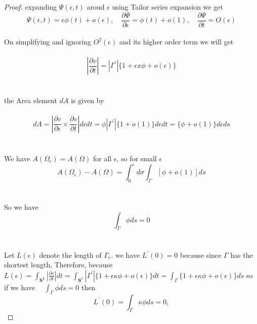 \documentclass[oneside]{book}
\begin{document}
\begin{proof}
expanding $\Psi(\epsilon, t)$ aroud $\epsilon$ using Tailor series expansion we get \\

$$
\Psi(\epsilon, t)=\epsilon \phi(t)+o(\epsilon), \quad \frac{\partial \Psi}{\partial \epsilon}=\phi(t)+o(1), \quad \frac{\partial \Psi}{\partial t}=O(\epsilon)
$$ \\
On simplifying and ignoring $O^2(\epsilon)$ and its higher order term we will get \\\\
$$
\left|\frac{\partial v}{\partial t}\right|=\left|\Gamma^{\prime}\right|\{1+\epsilon x \phi+o(\epsilon)\}
$$ 
\\\\
 the Area element $d A$  is given by
 \\\\
     \begin{equation}
     \label{eq13}  
d A=\left|\frac{\partial v}{\partial \epsilon} \times \frac{\partial v}{\partial t}\right| d \epsilon d t=\phi\left|\Gamma^{\prime}\right|\{1+o(1)\} d \epsilon d t=\{\phi+o(1)\} d \epsilon d s
    \end{equation} \\\\
We have $A\left(\Omega_{\epsilon}\right)=A(\Omega)$ for all $\epsilon$, so for small $\epsilon$ \\

 $$
A\left(\Omega_{\epsilon}\right)-A(\Omega)=\int_{0}^{\epsilon} d \sigma \int_{\Gamma}[\phi+o(1)] d s
$$
\\\\
So we have \\
$$  
\int_{\Gamma} \phi d s=0
$$ \\\\
 Let $L(\epsilon)$ denote the length of $\Gamma_{e} .$  we have
$L^{\prime}(0)=0$ because since $\Gamma$ has the shortest length, Therefore, because
$L(\epsilon)=\int_{\mathbf{S^1}}\left|\frac{\partial v}{\partial t}\right| d t=\int_{\mathbf{S}^{1}}\left|\Gamma^{\prime}\right|\{1+\epsilon \kappa \phi+o(\epsilon)\} d t=\int_{\Gamma}\{1+\epsilon \kappa \phi+o(\epsilon)\} d s$
 so if we have
 $\quad \int_{\Gamma} \phi d s=0$ then 
$$
L^{\prime}(0)=\int_{\Gamma} \kappa \phi d s=0, 
$$

\end{proof} 
\end{document}
